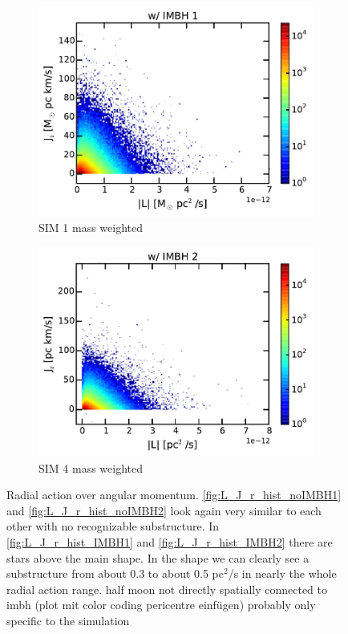 \begin{figure}[htbp]
\begin{subfigure}{0.475\textwidth}
		\includegraphics[width=\textwidth]{Plots/L_J_r_mass_hist_IMBH1.pdf}
		\caption{SIM 1 mass weighted}
		\label{fig:L_J_r_mass_hist_IMBH1}
	\end{subfigure}
	\hfill
	\begin{subfigure}{0.475\textwidth}
		\includegraphics[width=\textwidth]{Plots/L_J_r_mass_hist_IMBH2.pdf}
		\caption{SIM 4 mass weighted}
		\label{fig:L_J_r_mass_hist_noIMBH2}
	\end{subfigure}
	\caption{Radial action over angular momentum. \ref{fig:L_J_r_hist_noIMBH1} and \ref{fig:L_J_r_hist_noIMBH2} look again very similar to each other with no recognizable substructure. In \ref{fig:L_J_r_hist_IMBH1} and \ref{fig:L_J_r_hist_IMBH2} there are stars above the main shape. In the shape we can clearly see a substructure from about 0.3 to about 0.5 pc\(^2\)/s in nearly the whole radial action range. \color{red}half moon not directly spatially connected to imbh (plot mit color coding pericentre einfügen) probably only specific to the simulation\color{black}}
	\label{fig:L_J_r_hist}
\end{figure}

